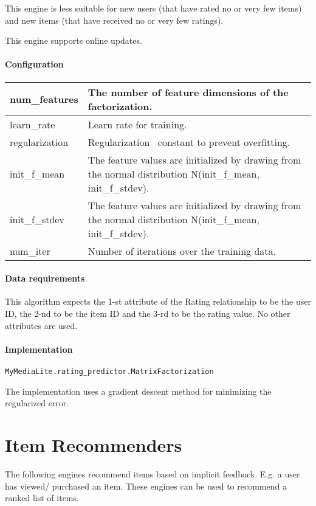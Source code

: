 \documentclass[]{report}
\begin{document}
This engine is less suitable for new users (that have rated no or
very few items) and new items (that have received no or very few
ratings).

This engine supports online updates.

\paragraph[Configuration]{Configuration}
\begin{flushleft}
\tablehead{}
\begin{supertabular}{|m{1.6712599in}|m{4.6781597in}|}
\hline
 num\_features &
 The number of feature dimensions of
the factorization.\\\hline
 learn\_rate &
 Learn rate for training.\\\hline
 regularization &
 Regularization \ constant to prevent
overfitting.\\\hline
 init\_f\_mean &
 The feature values are initialized by
drawing from the normal distribution N(init\_f\_mean,
init\_f\_stdev).\\\hline
 init\_f\_stdev &
 The feature values are initialized by
drawing from the normal distribution N(init\_f\_mean,
init\_f\_stdev).\\\hline
 num\_iter &
 Number of iterations over the training
data.\\\hline
\end{supertabular}
\end{flushleft}
\paragraph[Data requirements]{Data requirements}
This algorithm expects the 1-{st} attribute of the Rating
relationship to be the user ID, the 2-{nd} to be the
item ID and the 3-{rd} to be the rating value. No other
attributes are used.

\paragraph[Implementation]{Implementation}
\texttt{MyMediaLite.rating\_predictor.MatrixFactorization}

The implementation uses a gradient descent method for minimizing the
regularized error.


\section[Item Recommenders]{Item Recommenders}
The following engines recommend items based on implicit feedback. E.g. a
user has viewed/ purchased an item. These engines can be used to
recommend a ranked list of items.
\end{document}
